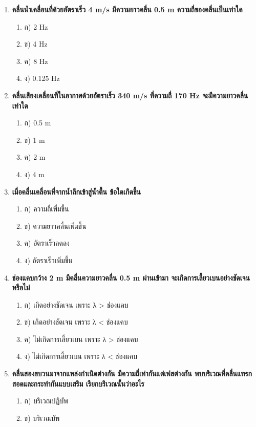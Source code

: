 \documentclass[12pt]{article}
\begin{document}
\begin{enumerate}
\begin{enumerate}
\item ข) กฎการสะท้อน
\item ค) กฎสเนลล์
\item ง) หลักฮอยเกนส์
\end{enumerate}
\item \textbf{คลื่นน้ำเคลื่อนที่ด้วยอัตราเร็ว 4 m/s มีความยาวคลื่น 0.5 m ความถี่ของคลื่นเป็นเท่าใด}
\begin{enumerate}
\item ก) 2 Hz
\item ข) 4 Hz
\item ค) 8 Hz
\item ง) 0.125 Hz
\end{enumerate}
\item \textbf{คลื่นเสียงเคลื่อนที่ในอากาศด้วยอัตราเร็ว 340 m/s ที่ความถี่ 170 Hz จะมีความยาวคลื่นเท่าใด}
\begin{enumerate}
\item ก) 0.5 m
\item ข) 1 m
\item ค) 2 m
\item ง) 4 m
\end{enumerate}
\item \textbf{เมื่อคลื่นเคลื่อนที่จากน้ำลึกเข้าสู่น้ำตื้น ข้อใดเกิดขึ้น}
\begin{enumerate}
\item ก) ความถี่เพิ่มขึ้น
\item ข) ความยาวคลื่นเพิ่มขึ้น
\item ค) อัตราเร็วลดลง
\item ง) อัตราเร็วเพิ่มขึ้น
\end{enumerate}
\item \textbf{ช่องแคบกว้าง 2 m มีคลื่นความยาวคลื่น 0.5 m ผ่านเข้ามา จะเกิดการเลี้ยวเบนอย่างชัดเจนหรือไม่}
\begin{enumerate}
\item ก) เกิดอย่างชัดเจน เพราะ λ > ช่องแคบ
\item ข) เกิดอย่างชัดเจน เพราะ λ < ช่องแคบ
\item ค) ไม่เกิดการเลี้ยวเบน เพราะ λ > ช่องแคบ
\item ง) ไม่เกิดการเลี้ยวเบน เพราะ λ < ช่องแคบ
\end{enumerate}
\item \textbf{คลื่นสองขบวนมาจากแหล่งกำเนิดต่างกัน มีความถี่เท่ากันแต่เฟสต่างกัน พบบริเวณที่คลื่นแทรกสอดและกระทำกันแบบเสริม เรียกบริเวณนั้นว่าอะไร}
\begin{enumerate}
\item ก) บริเวณปฏิบัพ
\item ข) บริเวณบัพ

\end{enumerate}
\end{enumerate}
\end{document}
